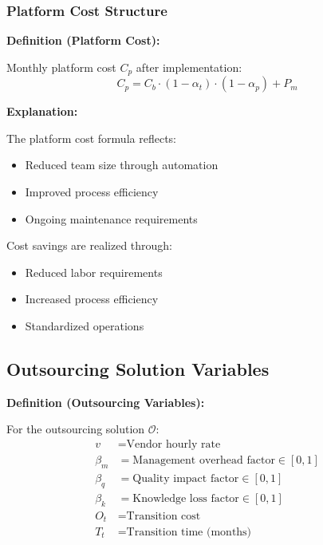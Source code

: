 \documentclass[12pt,a4paper]{article}
\newenvironment{definition}[1]
{\begin{mdframed}[style=definitionstyle]
\textbf{Definition (#1):}\par}
{\end{mdframed}}
\newenvironment{explanation}
{\begin{mdframed}[style=explanationstyle]
\textbf{Explanation:}\par}
{\end{mdframed}}
\begin{document}
\subsubsection{Platform Cost Structure}
\begin{definition}{Platform Cost}
Monthly platform cost $C_p$ after implementation:
\begin{equation}
    C_p = C_b \cdot (1 - \alpha_t) \cdot (1 - \alpha_p) + P_m
\end{equation}
\end{definition}

\begin{explanation}
The platform cost formula reflects:
\begin{itemize}
    \item Reduced team size through automation
    \item Improved process efficiency
    \item Ongoing maintenance requirements
\end{itemize}
Cost savings are realized through:
\begin{itemize}
    \item Reduced labor requirements
    \item Increased process efficiency
    \item Standardized operations
\end{itemize}
\end{explanation}

\subsection{Outsourcing Solution Variables}
\begin{definition}{Outsourcing Variables}
For the outsourcing solution $\mathcal{O}$:
\begin{align*}
    v &= \text{Vendor hourly rate} \\
    \beta_m &= \text{Management overhead factor} \in [0,1] \\
    \beta_q &= \text{Quality impact factor} \in [0,1] \\
    \beta_k &= \text{Knowledge loss factor} \in [0,1] \\
    O_t &= \text{Transition cost} \\
    T_t &= \text{Transition time (months)}
\end{align*}
\end{definition}
\end{document}
